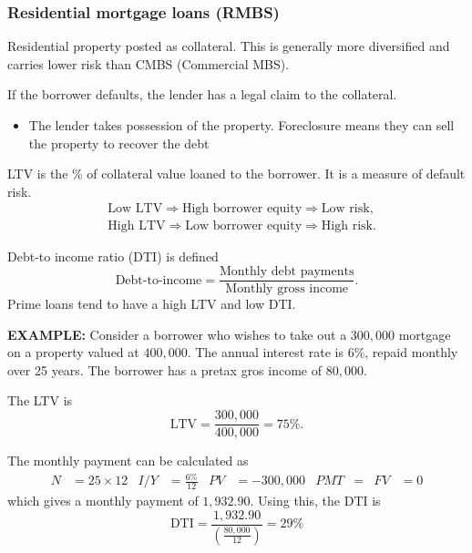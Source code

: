 \documentclass[../notes_compiled.tex]{subfiles}
\begin{document}
\subsubsection{Residential mortgage loans (RMBS)}
\begin{itemize}
\item Residential property posted as collateral. This is generally more diversified and carries lower risk than CMBS (Commercial MBS).
\item If the borrower defaults, the lender has a legal claim to the collateral.
\begin{itemize}
\item The lender takes possession of the property. Foreclosure means they can sell the property to recover the debt
\end{itemize}
\item LTV is the \% of collateral value loaned to the borrower. It is a measure of default risk.
\begin{align*}
&\text{Low LTV} \Rightarrow \text{High borrower equity} \Rightarrow \text{Low risk}, \\
&\text{High LTV} \Rightarrow \text{Low borrower equity} \Rightarrow \text{High risk}.
\end{align*}

\item Debt-to income ratio (DTI) is defined
\begin{equation}
\text{Debt-to-income} = \frac{\text{Monthly debt payments}}{\text{Monthly gross income}}.
\end{equation}
Prime loans tend to have a high LTV and low DTI.

{\color{RedViolet}
\item[] \textbf{EXAMPLE:} Consider a borrower who wishes to take out a $300,000$ mortgage on a property valued at $400,000$. The annual interest rate is 6\%, repaid monthly over 25 years. The borrower has a pretax gros income of $80,000$.
}
{\color{RoyalBlue}
\item[] The LTV is
\begin{equation*}
\text{LTV} = \frac{300,000}{400,000} = 75\%.
\end{equation*}

\item[] The monthly payment can be calculated as
\begin{align*}
N&=25\times12  & I / Y &=\frac{6\%}{12} & PV &=-300,000 & PMT &= & FV &=0
\end{align*}
which gives a monthly payment of $1,932.90$. Using this, the DTI is
\begin{equation*}
\text{DTI} = \frac{1,932.90}{\left( \frac{80,000}{12}\right)}=29\%
\end{equation*}
}


\end{itemize}
\end{document}
